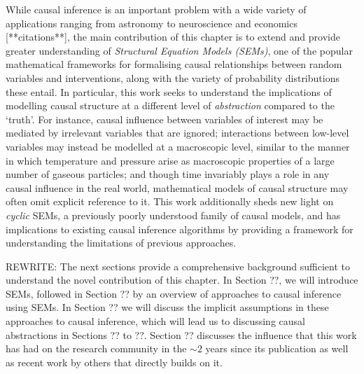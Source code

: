 While causal inference is an important problem with a wide variety of applications ranging from astronomy to neuroscience and economics [**citations**], the main contribution of this chapter is to extend and provide greater understanding of \emph{Structural Equation Models (SEMs)}, one of the popular mathematical frameworks for formalising causal relationships between random variables and interventions, along with the variety of probability distributions these entail. 
In particular, this work seeks to understand the implications of modelling causal structure at a different level of \emph{abstraction} compared to the `truth'. For instance, causal influence between variables of interest may be mediated by irrelevant variables that are ignored; interactions between low-level variables may instead be modelled at a macroscopic level, similar to the manner in which temperature and pressure arise as macroscopic properties of a large number of gaseous particles; and though time invariably plays a role in any causal influence in the real world, mathematical models of causal structure may often omit explicit reference to it.
This work additionally sheds new light on \emph{cyclic} SEMs, a previously poorly understood family of causal models, and has implications to existing causal inference algorithms by providing a framework for understanding the limitations of previous approaches.

REWRITE:
The next sections provide a comprehensive background sufficient to understand the novel contribution of this chapter.
In Section ??, we will introduce SEMs, followed in Section ?? by an overview of approaches to causal inference using SEMs. 
In Section ?? we will discuss the implicit assumptions in these approaches to causal inference, which will lead us to discussing causal abstractions in Sections ?? to ??.
Section ?? discusses the influence that this work has had on the research community in the $\sim 2$ years since its publication as well as recent work by others that directly builds on it.






